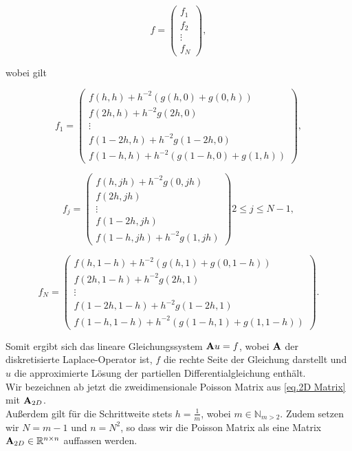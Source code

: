 \begin{equation}
f =
\begin{pmatrix}
f_{1} \\ f_{2} \\ \vdots \\ f_{N}
\end{pmatrix},
\end{equation}

wobei gilt

\begin{equation}
f_{1} = 
\begin{pmatrix}
f(h,h) + h^{-2}(g(h,0)+g(0,h)) \\
f(2h,h) + h^{-2} g(2h,0) \\
\vdots \\
f(1-2h,h) + h^{-2} g(1-2h,0) \\
f(1-h,h) + h^{-2}(g(1-h,0)+g(1,h))
\end{pmatrix},
\end{equation}

\begin{equation}
f_{j} = 
\begin{pmatrix}
f(h,jh) + h^{-2} g(0,jh) \\
f(2h,jh) \\
\vdots \\
f(1-2h,jh) \\
f(1-h,jh) + h^{-2} g(1,jh)
\end{pmatrix}
2 \le j \le N-1,
\end{equation}

\begin{equation}
f_{N} = 
\begin{pmatrix}
f(h,1-h) + h^{-2}(g(h,1)+g(0,1-h)) \\
f(2h,1-h) + h^{-2} g(2h,1) \\
\vdots \\
f(1-2h,1-h) + h^{-2} g(1-2h,1) \\
f(1-h,1-h) + h^{-2}(g(1-h,1)+g(1,1-h))
\end{pmatrix}.
\end{equation}

Somit ergibt sich das lineare Gleichungssystem ${\textbf{A}}u = f$, wobei ${\textbf{A}}$ der diskretisierte Laplace-Operator ist, $f$ die rechte Seite der Gleichung darstellt und $u$ die approximierte Lösung der partiellen Differentialgleichung enthält.\\
Wir bezeichnen ab jetzt die zweidimensionale Poisson Matrix aus \autoref{eq.2D Matrix} mit ${\textbf{A}}_{2D}$. \\
Außerdem gilt für die Schrittweite stets $h = \frac{1}{m}$, wobei $m \in \mathbb{N}_{m > 2}$. Zudem setzen wir $N = m-1$ und $n = N^{2}$, so dass wir die Poisson Matrix als eine Matrix ${\textbf{A}}_{2D} \in \mathbb{R}^{n \times n}$ auffassen werden.

